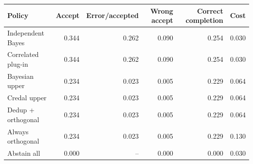 \begin{tabular}{@{}lrrrrr@{}}
\toprule
Policy & Accept & Error/accepted & Wrong accept & Correct completion & Cost\\
\midrule
Independent Bayes & 0.344 & 0.262 & 0.090 & 0.254 & 0.030\\
Correlated plug-in & 0.344 & 0.262 & 0.090 & 0.254 & 0.030\\
Bayesian upper & 0.234 & 0.023 & 0.005 & 0.229 & 0.064\\
Credal upper & 0.234 & 0.023 & 0.005 & 0.229 & 0.064\\
Dedup + orthogonal & 0.234 & 0.023 & 0.005 & 0.229 & 0.064\\
Always orthogonal & 0.234 & 0.023 & 0.005 & 0.229 & 0.130\\
Abstain all & 0.000 & -- & 0.000 & 0.000 & 0.030\\
\bottomrule
\end{tabular}
